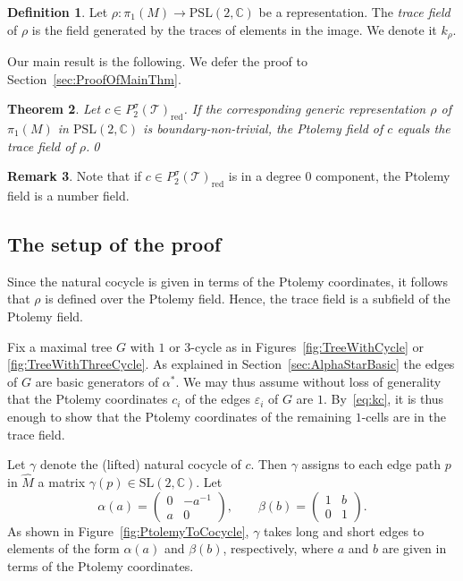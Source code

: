 \documentclass[12pt]{amsart}
\newtheorem{theorem}{Theorem}[section]
\theoremstyle{definition}
\newtheorem{definition}[theorem]{Definition}
\newtheorem{remark}[theorem]{Remark}
\numberwithin{equation}{section}
\def\a{\alpha}
\def\SL{\mathrm{SL}}
\def\PSL{\mathrm{PSL}}
\def\C{\mathbb{C}}
\def\T{\mathcal{T}}
\def\rd{\mathrm{red}}
\begin{document}
\begin{definition}
Let $\rho:\pi_1(M)\to\PSL(2,\C)$ be a representation. The \emph{trace field} of $\rho$ is the field generated by the traces of elements in the image. 
We denote it $k_\rho$.
\end{definition}
Our main result is the following. We defer the proof to Section~\ref{sec:ProofOfMainThm}.
\begin{theorem}\label{thm:PtolemyEqTrace} Let $c\in P^\sigma_2(\T)_\rd$. If the corresponding generic representation $\rho$ of $\pi_1(M)$ in $\PSL(2,\C)$ is boundary-non-trivial, the Ptolemy field of $c$ equals the trace field of $\rho$.\qed
\end{theorem}
\begin{remark}
Note that if $c\in P^\sigma_2(\T)_\rd$ is in a degree $0$ component, the Ptolemy field is a number field. %
\end{remark}
\subsection{The setup of the proof}
Since the natural cocycle is given in terms of the Ptolemy coordinates, it follows that $\rho$ is defined over the Ptolemy field. Hence, the trace field is a subfield of the Ptolemy field.

Fix a maximal tree $G$ with $1$ or $3$-cycle as in Figures~\ref{fig:TreeWithCycle} or \ref{fig:TreeWithThreeCycle}. As explained in Section~\ref{sec:AlphaStarBasic} the edges of $G$ are basic generators of $\alpha^*$. We may thus assume without loss of generality that the Ptolemy coordinates $c_i$ of the edges $\varepsilon_i$ of $G$ are $1$. By~\eqref{eq:kc}, it is thus enough to show that the Ptolemy coordinates of the remaining $1$-cells are in the trace field.


Let $\gamma$ denote the (lifted) natural cocycle of $c$. Then $\gamma$ assigns to each edge path $p$ in $\widehat M$ a matrix $\gamma(p)\in\SL(2,\C)$. Let
\begin{equation}\label{eq:AlphaBeta}
\alpha(a)=\begin{pmatrix}0&-a^{-1}\\a&0\end{pmatrix},\qquad \beta(b)=\begin{pmatrix}1&b\\0&1\end{pmatrix}.
\end{equation}
As shown in Figure~\ref{fig:PtolemyToCocycle}, $\gamma$ takes long and short edges to elements of the form $\alpha(a)$ and $\beta(b)$, respectively, where $a$ and $b$ are given in terms of the Ptolemy coordinates.
\end{document}
